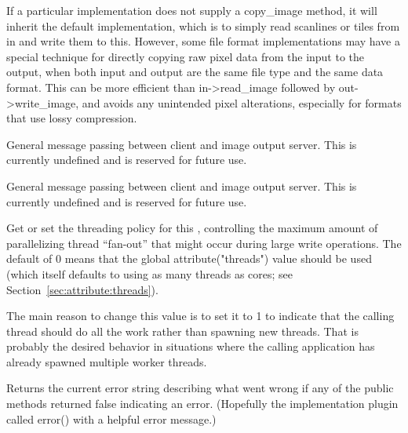 If a particular \ImageOutput implementation does not supply a
{\cf copy_image} method, it will inherit the default implementation,
which is to simply read scanlines or tiles from {\cf in} and write
them to {\cf *this}.  However, some file format implementations may have a
special technique for directly copying raw pixel data from the
input to the output, when both input and output are the same
file type and the same data format.  This can be more efficient 
than {\cf in->read_image} followed by {\cf out->write_image}, and avoids any
unintended pixel alterations, especially for formats that use
lossy compression.
\apiend

General message passing between client and image output server.
This is currently undefined and is reserved for future use.
\apiend

General message passing between client and image output server.
This is currently undefined and is reserved for future use.
\apiend

Get or set the threading policy for this \ImageOutput, controlling the
maximum amount of parallelizing thread ``fan-out'' that might occur during
large write operations. The default of 0 means that the global
{\cf attribute("threads")} value should be used (which itself defaults to
using as many threads as cores; see Section~\ref{sec:attribute:threads}).

The main reason to change this value is to set it to 1 to indicate that the
calling thread should do all the work rather than spawning new threads. That
is probably the desired behavior in situations where the calling application
has already spawned multiple worker threads.
\apiend

Returns the current error string describing what went wrong if
any of the public methods returned {\kw false} indicating an error.
(Hopefully the implementation plugin called {\kw error()} with a
helpful error message.)
\apiend




\chapwidthend
